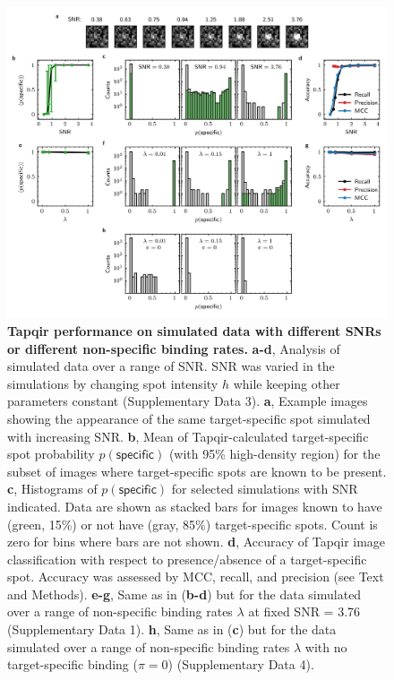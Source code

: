 \begin{figure}[h]
\centering
\includegraphics[width=1\textwidth]{figures/figure5.png}
\caption{\textbf{Tapqir performance on simulated data with different SNRs or different non-specific binding rates.} \textbf{a-d}, Analysis of simulated data over a range of SNR. SNR was varied in the simulations by changing spot intensity  $h$ while keeping other parameters constant (Supplementary Data 3). \textbf{a}, Example images showing the appearance of the same target-specific spot simulated with increasing SNR.   \textbf{b}, Mean of Tapqir-calculated target-specific spot probability $p(\mathsf{specific})$ (with 95\% high-density region) for the subset of images where target-specific spots  are known to be present. \textbf{c}, Histograms of $p(\mathsf{specific})$ for selected simulations with SNR indicated. Data are shown as stacked bars for images known to have (green, 15\%) or not have (gray, 85\%) target-specific spots.  Count is zero for bins where bars are not shown. \textbf{d}, Accuracy of Tapqir image classification with respect to presence/absence of a target-specific spot. Accuracy was assessed by MCC, recall, and precision (see Text and Methods). \textbf{e-g}, Same as in (\textbf{b-d}) but for the data simulated over a range of non-specific binding rates $\lambda$ at fixed SNR = 3.76 (Supplementary Data 1). \textbf{h}, Same as in (\textbf{c}) but for the data simulated over a range of non-specific binding rates $\lambda$ with no target-specific binding ($\pi = 0$) (Supplementary Data 4).}
\label{fig:tapqir_performance}
\end{figure}


